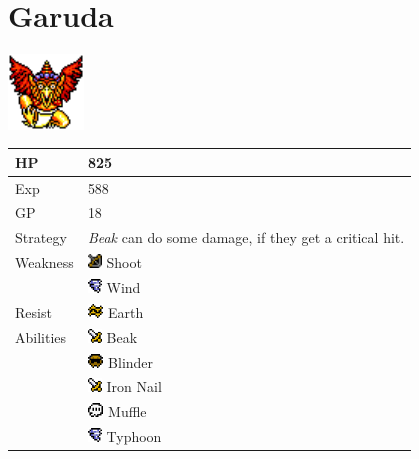 \section{Garuda}
\label{monster:garuda}

\includegraphics[height=2cm,keepaspectratio]{./resources/monster/garuda}

\begin{longtable}{ l p{9cm} }
	HP
	& 825
\\ \hline
	Exp
	& 588
\\ \hline
	GP
	& 18
\\ \hline
	Strategy
	& \textit{Beak} can do some damage, if they get a critical hit.
\\ \hline
	Weakness
	& \includegraphics[height=1em,keepaspectratio]{./resources/effects/shoot} Shoot \\
	& \includegraphics[height=1em,keepaspectratio]{./resources/effects/wind} Wind
\\ \hline
	Resist
	& \includegraphics[height=1em,keepaspectratio]{./resources/effects/earth} Earth
\\ \hline
	Abilities
	& \includegraphics[height=1em,keepaspectratio]{./resources/effects/damage} Beak \\
	& \includegraphics[height=1em,keepaspectratio]{./resources/effects/blind} Blinder \\
	& \includegraphics[height=1em,keepaspectratio]{./resources/effects/damage} Iron Nail \\
	& \includegraphics[height=1em,keepaspectratio]{./resources/effects/silence} Muffle \\
	& \includegraphics[height=1em,keepaspectratio]{./resources/effects/wind} Typhoon
\end{longtable}
